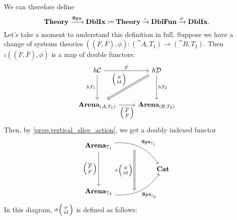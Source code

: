 \documentclass[DynamicalBook]{subfiles}
\begin{document}
We can therefore define
\[
\textbf{Theory} \xrightarrow{\textbf{Sys}} \textbf{DblIx} \coloneqq \textbf{Theory} \xrightarrow{\iota}
\textbf{DblFun} \xrightarrow{\sigma} \textbf{DblIx}.
\]
Let's take a moment to understand this definition in full. Suppose we have a
change of systems theories $((F, \overline{F}), \phi) : (\cat{A}, T_1) \to (\cat{B},
T_2)$. Then $\iota((F, \overline{F}), \phi)$ is a map of double functors:
\[
  \begin{tikzcd}[row sep = huge]
    h\cat{C} \ar[r, "F"]\ar[d, "hT_1"'] & h\cat{D} \ar[d, "hT_2"]\ar[dl, Rightarrow, "{\littlelens{\phi}{\id}}"'] \\
    \Cat{Arena}_{(\cat{A}, T_1)}\ar[r, "{\lens{\overline{F}}{F}}"']
     & \Cat{Arena}_{(\cat{B}, T_2)}
  \end{tikzcd}
\]
Then, by \cref{prop.vertical_slice_action}, we get a doubly indexed functor
\[
\begin{tikzcd}
\Cat{Arena}_{\dd_1} \arrow[dd, "{\littlelens{\overline{F}}{F}}"'] \arrow[rrd, "{
  \Cat{Sys}_{\dd_1}}", bend left] & {}
\arrow[dd, "{\sigma \littlelens{\phi}{\id}}"', Rightarrow] &      \\
  &   & \Cat{Cat} \\
\Cat{Arena}_{\dd_2} \arrow[rru, bend right, "{\Cat{Sys}_{\dd_2}}"']      & {}   &     
\end{tikzcd}
\]
In this diagram, $\sigma\littlelens{\phi}{\id}$ is defined as follows:
\end{document}
